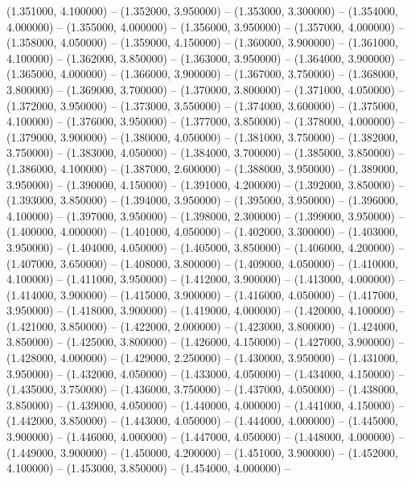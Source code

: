 (1.351000, 4.100000) -- 
(1.352000, 3.950000) -- 
(1.353000, 3.300000) -- 
(1.354000, 4.000000) -- 
(1.355000, 4.000000) -- 
(1.356000, 3.950000) -- 
(1.357000, 4.000000) -- 
(1.358000, 4.050000) -- 
(1.359000, 4.150000) -- 
(1.360000, 3.900000) -- 
(1.361000, 4.100000) -- 
(1.362000, 3.850000) -- 
(1.363000, 3.950000) -- 
(1.364000, 3.900000) -- 
(1.365000, 4.000000) -- 
(1.366000, 3.900000) -- 
(1.367000, 3.750000) -- 
(1.368000, 3.800000) -- 
(1.369000, 3.700000) -- 
(1.370000, 3.800000) -- 
(1.371000, 4.050000) -- 
(1.372000, 3.950000) -- 
(1.373000, 3.550000) -- 
(1.374000, 3.600000) -- 
(1.375000, 4.100000) -- 
(1.376000, 3.950000) -- 
(1.377000, 3.850000) -- 
(1.378000, 4.000000) -- 
(1.379000, 3.900000) -- 
(1.380000, 4.050000) -- 
(1.381000, 3.750000) -- 
(1.382000, 3.750000) -- 
(1.383000, 4.050000) -- 
(1.384000, 3.700000) -- 
(1.385000, 3.850000) -- 
(1.386000, 4.100000) -- 
(1.387000, 2.600000) -- 
(1.388000, 3.950000) -- 
(1.389000, 3.950000) -- 
(1.390000, 4.150000) -- 
(1.391000, 4.200000) -- 
(1.392000, 3.850000) -- 
(1.393000, 3.850000) -- 
(1.394000, 3.950000) -- 
(1.395000, 3.950000) -- 
(1.396000, 4.100000) -- 
(1.397000, 3.950000) -- 
(1.398000, 2.300000) -- 
(1.399000, 3.950000) -- 
(1.400000, 4.000000) -- 
(1.401000, 4.050000) -- 
(1.402000, 3.300000) -- 
(1.403000, 3.950000) -- 
(1.404000, 4.050000) -- 
(1.405000, 3.850000) -- 
(1.406000, 4.200000) -- 
(1.407000, 3.650000) -- 
(1.408000, 3.800000) -- 
(1.409000, 4.050000) -- 
(1.410000, 4.100000) -- 
(1.411000, 3.950000) -- 
(1.412000, 3.900000) -- 
(1.413000, 4.000000) -- 
(1.414000, 3.900000) -- 
(1.415000, 3.900000) -- 
(1.416000, 4.050000) -- 
(1.417000, 3.950000) -- 
(1.418000, 3.900000) -- 
(1.419000, 4.000000) -- 
(1.420000, 4.100000) -- 
(1.421000, 3.850000) -- 
(1.422000, 2.000000) -- 
(1.423000, 3.800000) -- 
(1.424000, 3.850000) -- 
(1.425000, 3.800000) -- 
(1.426000, 4.150000) -- 
(1.427000, 3.900000) -- 
(1.428000, 4.000000) -- 
(1.429000, 2.250000) -- 
(1.430000, 3.950000) -- 
(1.431000, 3.950000) -- 
(1.432000, 4.050000) -- 
(1.433000, 4.050000) -- 
(1.434000, 4.150000) -- 
(1.435000, 3.750000) -- 
(1.436000, 3.750000) -- 
(1.437000, 4.050000) -- 
(1.438000, 3.850000) -- 
(1.439000, 4.050000) -- 
(1.440000, 4.000000) -- 
(1.441000, 4.150000) -- 
(1.442000, 3.850000) -- 
(1.443000, 4.050000) -- 
(1.444000, 4.000000) -- 
(1.445000, 3.900000) -- 
(1.446000, 4.000000) -- 
(1.447000, 4.050000) -- 
(1.448000, 4.000000) -- 
(1.449000, 3.900000) -- 
(1.450000, 4.200000) -- 
(1.451000, 3.900000) -- 
(1.452000, 4.100000) -- 
(1.453000, 3.850000) -- 
(1.454000, 4.000000) -- 
